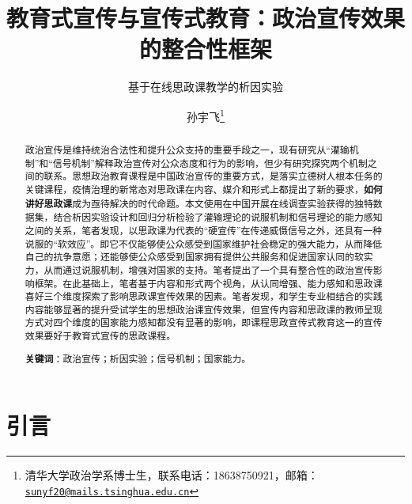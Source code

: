 \documentclass[
  12pt,
]{ctexart}
\title{教育式宣传与宣传式教育：政治宣传效果的整合性框架}
\subtitle{基于在线思政课教学的析因实验}
\author{孙宇飞\footnote{清华大学政治学系博士生，联系电话：18638750921，邮箱：\href{mailto:sunyf20@mails.tsinghua.edu.cn}{\nolinkurl{sunyf20@mails.tsinghua.edu.cn}}}}
\date{}
\begin{document}
\maketitle
\begin{abstract}
政治宣传是维持统治合法性和提升公众支持的重要手段之一，现有研究从``灌输机制''和``信号机制''解释政治宣传对公众态度和行为的影响，但少有研究探究两个机制之间的联系。思想政治教育课程是中国政治宣传的重要方式，是落实立德树人根本任务的关键课程，疫情治理的新常态对思政课在内容、媒介和形式上都提出了新的要求，\textbf{如何讲好思政课}成为亟待解决的时代命题。本文使用在中国开展在线调查实验获得的独特数据集，结合析因实验设计和回归分析检验了灌输理论的说服机制和信号理论的能力感知之间的关系，笔者发现，以思政课为代表的``硬宣传''在传递威慑信号之外，还具有一种说服的``软效应''。即它不仅能够使公众感受到国家维护社会稳定的强大能力，从而降低自己的抗争意愿；还能够使公众感受到国家拥有提供公共服务和促进国家认同的软实力，从而通过说服机制，增强对国家的支持。笔者提出了一个具有整合性的政治宣传影响框架。在此基础上，笔者基于内容和形式两个视角，从认同增强、能力感知和思政课喜好三个维度探索了影响思政课宣传效果的因素。笔者发现，和学生专业相结合的实践内容能够显著的提升受试学生的思想政治课宣传效果，但宣传内容和思政课的教师呈现方式对四个维度的国家能力感知都没有显著的影响，即课程思政宣传式教育这一的宣传效果要好于教育式宣传的思政课程。

\textbf{关键词}：政治宣传；析因实验；信号机制；国家能力。
\end{abstract}

\newpage

\hypertarget{ux5f15ux8a00}{%
\section{引言}\label{ux5f15ux8a00}}
\end{document}
